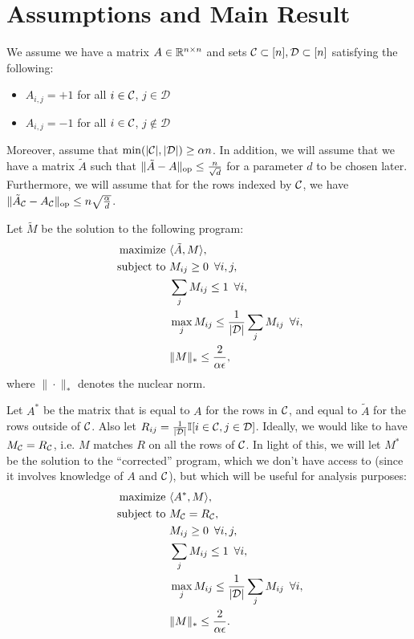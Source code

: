 \documentclass[11pt]{article}
\newcommand{\M}{\tilde{M}}
\newcommand{\Mm}{M^*}
\newcommand{\A}{\tilde{A}}
\newcommand{\Aa}{A^*}
\newcommand{\sD}{\mathcal{D}}
\begin{document}
\section{Assumptions and Main Result}
We assume we have a matrix $A \in \mathbb{R}^{n \times n}$ and sets 
$\sC \subset [n], \sD \subset [n]$ satisfying the following:
\begin{itemize}
\item $A_{i,j} = +1$ for all $i \in \mathcal{C}$, $j \in \sD$
\item $A_{i,j} = -1$ for all $i \in \mathcal{C}$, $j \not\in \sD$
\end{itemize}
Moreover, assume that $\min(|\sC|, |\sD|) \geq \alpha n$.
In addition, we will assume that we have a matrix $\A$ such 
that $\|\A-A\|_{\op} \leq \frac{n}{\sqrt{d}}$ for a parameter 
$d$ to be chosen later. Furthermore, we will assume that for the 
rows indexed by $\mathcal{C}$, we have $\|\A_{\sC}-A_{\sC}\|_{\op} \leq n\sqrt{\frac{\alpha}{d}}$.

Let $\M$ be the solution to the following program:
\begin{align}
\label{eq:optimization-noisy}
\text{maximize } &\langle \A, M \rangle, \\
\notag \text{ subject to } &M_{ij} \geq 0 \,\,\, \forall i,j, \\
\notag  &\sum_j M_{ij} \leq 1 \,\,\, \forall i, \\
\notag  &\max_j M_{ij} \leq \frac{1}{|\sD|}\sum_j M_{ij} \,\,\, \forall i, \\
\notag  &\|M\|_* \leq \frac{2}{\alpha\epsilon},
\end{align}
where $\|\cdot\|_*$ denotes the nuclear norm.

Let $\Aa$ be the matrix that is equal to $A$ for the rows in $\mathcal{C}$, 
and equal to $\A$ for the rows outside of $\mathcal{C}$. Also let $R_{ij} = \frac{1}{|\sD|}\bI[i \in \sC, j \in \sD]$. 
Ideally, we would like to have $M_{\mathcal{C}} = R_{\mathcal{C}}$, i.e. $M$ matches $R$ on 
all the rows of $\mathcal{C}$. In light of this, 
we will let $\Mm$ be the solution to the ``corrected'' program, which 
we don't have access to (since it involves knowledge of $A$ and $\mathcal{C}$), but which 
will be useful for analysis purposes:
\begin{align}
\label{eq:optimization-noiseless}
\text{maximize } &\langle \Aa, M \rangle, \\
\notag \text{ subject to } &M_{\sC} = R_{\sC}, \\
\notag  &M_{ij} \geq 0 \,\,\, \forall i,j, \\
\notag  &\sum_j M_{ij} \leq 1 \,\,\, \forall i, \\
\notag  &\max_j M_{ij} \leq \frac{1}{|\sD|}\sum_j M_{ij} \,\,\, \forall i, \\
\notag  &\|M\|_* \leq \frac{2}{\alpha\epsilon}.
\end{align}
\end{document}
